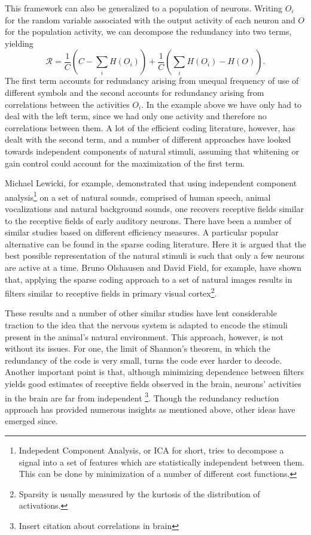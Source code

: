 This framework can also be generalized to a population of neurons. Writing $O_i$ for the random variable associated with the output activity of each neuron and $O$ for the population activity, we can decompose the redundancy into two terms, yielding
$$
\mathcal{R} = \frac{1}{C} \left(C - \sum_i H(O_i) \right) + \frac{1}{C}\left(\sum_i H(O_i) -H(O)\right).
$$
The first term accounts for redundancy arising from unequal frequency of use of different symbols and the second accounts for redundancy arising from correlations between the activities $O_i$. In the example above we have only had to deal with the left term, since we had only one activity and therefore no correlations between them. A lot of the efficient coding literature, however, has dealt with the second term, and a number of different approaches have looked towards independent components of natural stimuli, assuming that whitening or gain control could account for the maximization of the first term.\par
Michael Lewicki\cite{Lewicki2002}, for example, demonstrated that using independent component analysis\footnote{Indepedent Component Analysis, or ICA for short, tries to decompose a signal into a set of features which are statistically independent between them. This can be done by minimization of a number of different cost functions.} on a set of natural sounds, comprised of human speech, animal vocalizations and natural background sounds, one recovers receptive fields similar to the receptive fields of early auditory neurons. There have been a number of similar studies based on different efficiency measures. A particular popular alternative can be found in the sparse coding literature. Here it is argued that the best possible representation of the natural stimuli is such that only a few neurons are active at a time. Bruno Olshausen and David Field\cite{Olshausen1996}, for example, have shown that, applying the sparse coding approach to a set of natural images results in filters similar to receptive fields in primary visual cortex\footnote{Sparsity is usually measured by the kurtosis of the distribution of activations.}.\par
These results and a number of other similar studies have lent considerable traction to the idea that the nervous system is adapted to encode the stimuli present in the animal's natural environment. This approach, however, is not without its issues. For one, the limit of Shannon's theorem, in which the redundancy of the code is very small, turns the code ever harder to decode. Another important point is that, although minimizing dependence between filters yields good estimates of receptive fields observed in the brain, neurons' activities in the brain are far from independent \footnote{Insert citation about correlations in brain}. Though the redundancy reduction approach has provided numerous insights as mentioned above, other ideas have emerged since.
